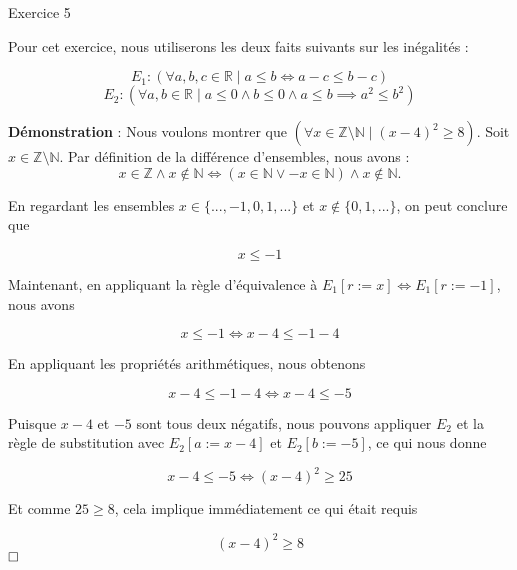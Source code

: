 \documentclass{article}
\begin{document}
Exercice 5

\vspace{0.5cm}
Pour cet exercice, nous utiliserons les deux faits suivants sur les inégalités :

$$E_1 : (\forall a,b,c \in \mathbb{R} \mid a \leq b \iff a - c \leq b - c)$$
$$E_2 : (\forall a,b \in \mathbb{R} \mid a \leq 0 \land b \leq 0 \land a \leq b \implies a^2 \leq b^2)$$

\textbf{Démonstration} : Nous voulons montrer que $(\forall x \in \mathbb{Z} \setminus \mathbb{N} \mid (x - 4)^2 \geq 8)$. Soit $x \in \mathbb{Z} \setminus \mathbb{N}$. Par définition de la différence d'ensembles, nous avons :
$$x \in \mathbb{Z} \land x \notin \mathbb{N} \iff (x \in \mathbb{N} \lor -x \in \mathbb{N}) \land x \notin \mathbb{N}.$$

En regardant les ensembles $x \in \{..., -1, 0, 1, ...\}$ et $x \notin \{0, 1, ...\}$, on peut conclure que 

$$ x \leq -1 $$

Maintenant, en appliquant la règle d'équivalence à $E_1[r := x] \iff E_1[r := -1]$, nous avons

$$ x \leq -1 \iff x - 4 \leq -1 - 4 $$

En appliquant les propriétés arithmétiques, nous obtenons

$$ x - 4 \leq -1 - 4 \iff x - 4 \leq -5 $$

Puisque $x - 4$ et $-5$ sont tous deux négatifs, nous pouvons appliquer $E_2$ et la règle de substitution avec $E_2[a := x-4]$ et $E_2[b := -5]$, ce qui nous donne

$$ x - 4 \leq -5 \iff (x - 4)^2 \geq 25 $$

Et comme $25 \geq 8$, cela implique immédiatement ce qui était requis

$$ (x - 4)^2 \geq 8 $$
$\hfill \square$
\end{document}
